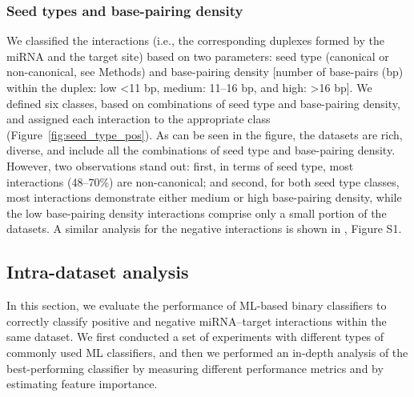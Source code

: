\documentclass{bmcart}
\begin{document}
\subsubsection*{Seed types and base-pairing density}
We classified the interactions (i.e., the corresponding duplexes formed by the miRNA and the target site) based on two parameters: seed type (canonical or non-canonical, see Methods) and base-pairing density [number of base-pairs (bp) within the duplex: low \textless 11 bp, medium: 11--16 bp, and high: \textgreater 16 bp]. We defined six classes, based on combinations of seed type and base-pairing density, and assigned each interaction to the appropriate class (Figure~\ref{fig:seed_type_pos}). As can be seen in the figure, the datasets are rich, diverse, and include all the combinations of seed type and base-pairing density.
However, two observations stand out: 
first, in terms of seed type, most interactions (48--70\%) are non-canonical; and second, for both seed type classes, most interactions demonstrate either medium or high base-pairing density, while the low base-pairing density interactions comprise only a small portion of the datasets. A similar analysis for the negative interactions is shown in , Figure S1.

\subsection*{Intra-dataset analysis} \label{nameref:indataset}
In this section, we evaluate the performance of ML-based binary classifiers to correctly classify positive and negative miRNA--target interactions within the same dataset. 
We first conducted a set of experiments with different types of commonly used ML classifiers, and then we performed an in-depth analysis of the best-performing classifier by measuring different performance metrics and by estimating feature importance.
\end{document}
